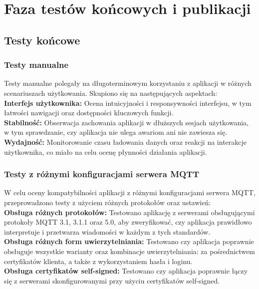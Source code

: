 \section{Faza testów końcowych i publikacji}

\subsection{Testy końcowe}
\subsubsection{Testy manualne}
Testy manualne polegały na długoterminowym korzystaniu z aplikacji w różnych scenariuszach użytkowania. Skupiono się na następujących aspektach:\\

\textbf{Interfejs użytkownika:} Ocena intuicyjności i responsywności interfejsu, w tym łatwości nawigacji oraz dostępności kluczowych funkcji.\\

\textbf{Stabilność:} Obserwacja zachowania aplikacji w dłuższych sesjach użytkowania, w tym sprawdzanie, czy aplikacja nie ulega awariom ani nie zawiesza się.\\

\textbf{Wydajność:} Monitorowanie czasu ładowania danych oraz reakcji na interakcje użytkownika, co miało na celu ocenę płynności działania aplikacji.

\subsubsection{Testy z różnymi konfiguracjami serwera MQTT}
W celu oceny kompatybilności aplikacji z różnymi konfiguracjami serwera MQTT, przeprowadzono testy z użyciem różnych protokołów oraz ustawień:\\

\textbf{Obsługa różnych protokołów:} Testowano aplikację z serwerami obsługującymi protokoły MQTT 3.1, 3.1.1 oraz 5.0, aby zweryfikować, czy aplikacja prawidłowo interpretuje i przetwarza wiadomości w każdym z tych standardów.\\

\textbf{Obsługa różnych form uwierzytelniania:} Testowano czy aplikacja poprawnie obsługuje wszystkie warianty oraz kombinacje uwierzytelniania: za pośrednictwem certyfikatów klienta, a także z wykorzystaniem hasła i loginu.\\

\textbf{Obsługa certyfikatów self-signed:} Testowano czy aplikacja poprawnie łączy się z serwerami skonfigurowanymi przy użyciu certyfikatów self-signed.

